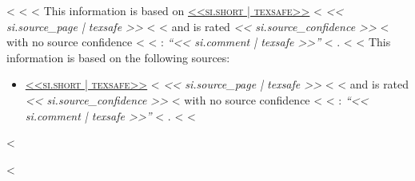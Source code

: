   <%
  <%
  <%
    This information is based on
    \textsc{\hyperlink{source<<si.source_id>>}{<<si.short | texsafe>>}}
    <%
    \emph{<< si.source_page | texsafe >>}
    <%
    <%
    and is rated
    \emph{<< si.source_confidence >>}
    <%
    with no source confidence
    <%
    <%
    : \emph{\enquote{<< si.comment | texsafe >>}}
    <%
    .
    <%
  <%
    This information is based on the following sources:

    \begin{itemize}
    <%
    \item
    \textsc{\hyperlink{source<<si.source_id>>}{<<si.short | texsafe>>}}
    <%
    \emph{<< si.source_page | texsafe >>}
    <%
    <%
    and is rated
    \emph{<< si.source_confidence >>}
    <%
    with no source confidence
    <%
    <%
    : \emph{\enquote{<< si.comment | texsafe >>}}
    <%
    .
    <%
    <%
    \end{itemize}
  <%

<%
